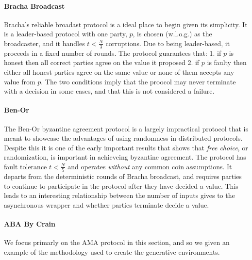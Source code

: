 \paragraph{Bracha Broadcast}
Bracha's reliable broadast protocol is a ideal place to begin given its simplicity.
It is a leader-based protocol with one party, $p$, is chosen (w.l.o.g.) as the broadcaster, and it handles $t < \frac{N}{3}$ corruptions.
Due to being leader-based, it proceeds in a fixed number of rounds.
The protocol guarantees that: 1. if $p$ is honest then all correct parties agree on the value it proposed 2. if $p$ is faulty then either all honest parties agree on the same value or none of them accepts any value from $p$. 
The two conditions imply that the proocol may never terminate with a decision in some cases, and that this is not considered a failure. 

\paragraph{Ben-Or}
The Ben-Or byzantine agreement protocol is a largely impractical protocol that is meant to showcase the advantages of using randomness in distributed protocols.
Despite this it is one of the early important results that shows that \emph{free choice}, or randomization, is important in achieveing byzantine agreement. 
The protocol has fault tolerance $t < \frac{N}{5}$ and operates \emph{without} any common coin assumptions.
It departs from the deterministic rounds of Bracha broadcast, and requires parties to continue to participate in the protocol after they have decided a value. 
This leads to an interesting relationship between the number of inputs \Z gives to the asynchronous wrapper and whether parties terminate decide a value.

\paragraph{ABA By Crain~\cite{crain}}

We focus primarly on the AMA protocol in this section, and so we given an example of the methodology used to create the generative environments. 

